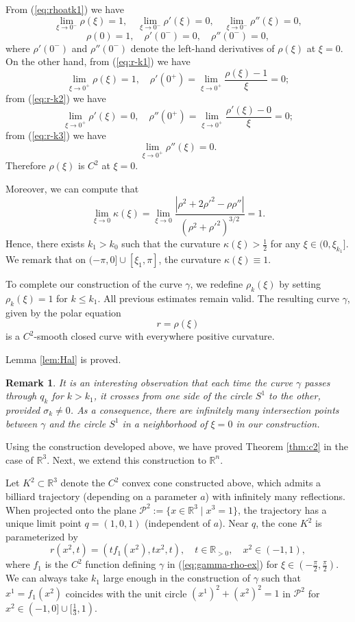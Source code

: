 \documentclass[12pt]{article}
\newtheorem{remark}{Remark}
\begin{document}
From (\ref{eq:rhoatk1}) we have 
$$
\lim_{\xi \to 0^-} \rho(\xi) = 1, 
\quad 
\lim_{\xi \to 0^-} \rho'(\xi) =0, 
\quad 
\lim_{\xi \to 0^-} \rho''(\xi) =0,
$$
$$
\rho(0) = 1,
\quad 
\rho'(0^-) =0,
\quad
\rho''(0^-) = 0,
$$
where $\rho'(0^-)$ and $\rho''(0^-)$ denote the left-hand derivatives of $\rho(\xi)$ at $\xi = 0$.
On the other hand, from (\ref{eq:r-k1}) we have
$$
\lim_{\xi \to 0^+} \rho(\xi) = 1, 
\quad
\rho'(0^+) = \lim_{\xi \to 0^+} \frac{\rho(\xi)-1}{\xi} = 0;
$$
from (\ref{eq:r-k2}) we have
$$
\lim_{\xi \to 0^+} \rho'(\xi) = 0, 
\quad 
\rho''(0^+) = \lim_{\xi \to 0^+} \frac{\rho'(\xi)-0}{\xi} = 0;
$$
from (\ref{eq:r-k3}) we have 
$$
\lim_{\xi \to 0^+} \rho''(\xi) = 0.
$$
Therefore $\rho(\xi)$ is $C^2$ at $\xi=0$.

Moreover, we can compute that
$$
\lim_{\xi \to 0} \kappa(\xi) = \lim_{\xi \to 0} \frac{|\rho^2 + 2 \rho'^{2} - \rho \rho''|}{(\rho^2 + \rho'^{2})^{3/2}} = 1.
$$
Hence, there exists $k_1 > k_0$ such that the curvature $\kappa(\xi) > \frac{1}{2}$ for any $\xi \in(0, \xi_{k_1}]$. 
We remark that
on $(-\pi, 0]\cup [\xi_1,\pi]$, the curvature $\kappa(\xi)  \equiv 1$.

To complete our construction of the curve $\gamma$, 
we redefine $\rho_{k}(\xi)$ by setting $\rho_{k}(\xi) = 1$ for $k\leq k_1$. 
All previous estimates remain valid.
The resulting curve $\gamma$, given by the polar equation
\begin{equation}\label{eq:gamma-rho-ex}
r = \rho(\xi)
\end{equation}
is a $C^2$-smooth closed curve with everywhere positive curvature.

Lemma \ref{lem:Hal} is proved.

\begin{remark}
  It is an interesting observation that each time the curve $\gamma$ passes through $q_k$ for $k > k_1$, 
  it crosses from one side of the circle $S^1$ to the other, provided $\sigma_k \neq 0$. 
  As a consequence, there are infinitely many intersection points between $\gamma$ and the circle $S^1$ in a neighborhood of $\xi = 0$ in our construction.
\end{remark}

Using the construction developed above, we have proved Theorem \ref{thm:c2} in the case of $\mathbb{R}^3$. 
Next, we extend this construction to $\mathbb{R}^n$.

Let $K^2 \subset \mathbb{R}^3$ denote the $C^2$ convex cone constructed above, which admits a billiard trajectory (depending on a parameter $a$) with infinitely many reflections. When projected onto the plane $\mathcal{P}^2:=\{x \in \mathbb{R}^3 \mid x^3 = 1\}$, the trajectory has a unique limit point $q = (1, 0, 1)$ (independent of $a$).  
Near $q$, the cone $K^2$ is parameterized by
$$
r( x^2, t) = (t f_1(x^2), t x^2, t),
\quad t \in \mathbb{R}_{>0},
\quad x^2 \in (-1, 1), 
$$  
where $f_1$ is the $C^2$ function defining $\gamma$ in (\ref{eq:gamma-rho-ex}) for $\xi\in (-\frac{\pi}{2}, \frac{\pi}{2})$.
We can always take $k_1$ large enough in the construction of $\gamma$ such that $x^1 = f_1(x^2)$ coincides with the unit circle $(x^1)^2+(x^2)^2=1$ in $\mathcal{P}^2$ for $x^2 \in (-1, 0]\cup [\frac{1}{3},1)$.
\end{document}
